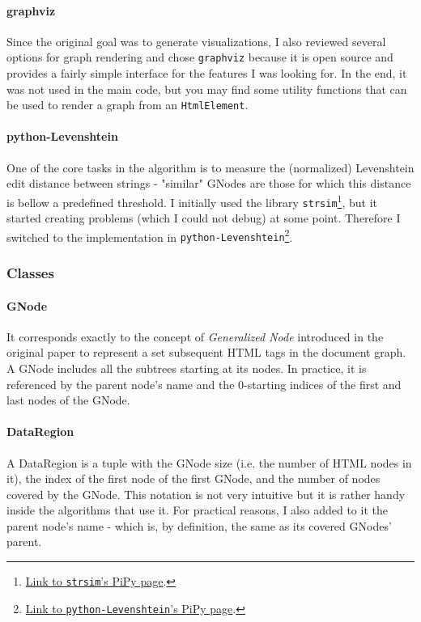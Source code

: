 \documentclass[10pt]{article}
\newcommand{\code}[1]{\colorbox{codegray}{\texttt{#1}}}
\begin{document}
\paragraph{graphviz} Since the original goal was to generate visualizations, I also reviewed several options for graph rendering and chose \code{graphviz} because it is open source and provides a fairly simple interface for the features I was looking for. In the end, it was not used in the main code, but you may find some utility functions that can be used to render a graph from an \code{HtmlElement}.

\paragraph{python-Levenshtein} One of the core tasks in the algorithm is to measure the (normalized) Levenshtein edit distance between strings - "similar" GNodes are those for which this distance is bellow a predefined threshold. I initially used the library \code{strsim}\footnote{\href{https://pypi.org/project/strsim/}{Link to \code{strsim}'s PiPy page}.}, but it started creating problems (which I could not debug) at some point. Therefore I switched to the implementation in \code{python-Levenshtein}\footnote{\href{https://pypi.org/project/python-Levenshtein/}{Link to \code{python-Levenshtein}'s PiPy page}.}.



\subsubsection{Classes} \label{txt:classes}

\paragraph{GNode}

It corresponds exactly to the concept of \emph{Generalized Node} introduced in the original paper to represent a set subsequent HTML tags in the document graph. A GNode includes all the subtrees starting at its nodes. In practice, it is referenced by the parent node's name and the 0-starting indices of the first and last nodes of the GNode.

\paragraph{DataRegion} A DataRegion is a tuple with the GNode size (i.e. the number of HTML nodes in it), the index of the first node of the first GNode, and the number of nodes covered by the GNode. This notation is not very intuitive but it is rather handy inside the algorithms that use it. For practical reasons, I also added to it the parent node's name - which is, by definition, the same as its covered GNodes' parent. 
\end{document}
